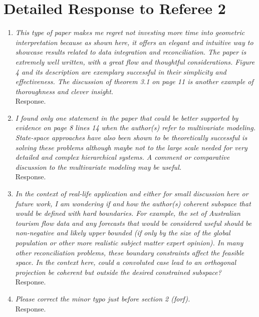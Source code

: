 \documentclass[a4paper,11pt]{article}
\begin{document}
    \section*{Detailed Response to Referee 2}

	\begin{enumerate}	
	
	\item \textit{This type of paper makes me regret not investing more time into geometric interpretation because as shown here, it offers an elegant and intuitive way to showcase results related to data integration and reconciliation. The paper is extremely well written, with a great flow and thoughtful considerations. Figure 4 and its description are exemplary successful in their simplicity and effectiveness. The discussion of theorem 3.1 on page 11 is another example of thoroughness and clever insight.}\\
	Response.\\
	
    \item\textit{I found only one statement in the paper that could be better supported by evidence on page 8 lines 14 when the author(s) refer to multivariate modeling. State-space approaches have also been shown to be theoretically successful is solving these problems although maybe not to the large scale needed for very detailed and complex hierarchical systems. A comment or comparative discussion to the multivariate modeling may be useful.}\\
    Response.\\
    
    
    \item\textit{In the context of real-life application and either for small discussion here or future work, I am wondering if and how the author(s) coherent subspace that would be defined with hard boundaries. For example, the set of Australian tourism flow data and any forecasts that would be considered useful should be non-negative and likely upper bounded (if only by the size of the global population or other more realistic subject matter expert opinion). In many other reconciliation problems, these boundary constraints affect the feasible space. In the context here, could a convoluted case lead to an orthogonal projection be coherent but outside the desired constrained subspace?}\\
    Response.\\

    \item\textit{Please correct the minor typo just before section 2 (forf).}\\
    Response.\\
    
    \end{enumerate}
\end{document}
